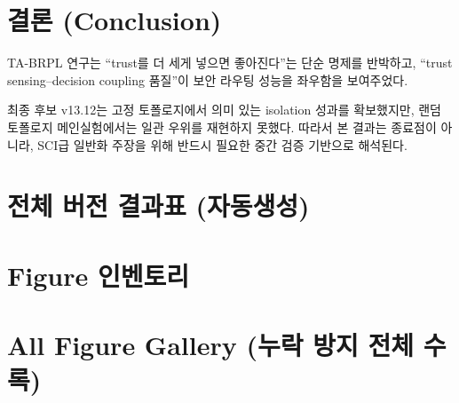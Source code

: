 \documentclass[11pt,a4paper]{report}
\begin{document}
\chapter{결론 (Conclusion)}
TA-BRPL 연구는 ``trust를 더 세게 넣으면 좋아진다''는 단순 명제를 반박하고,
``trust sensing--decision coupling 품질''이 보안 라우팅 성능을 좌우함을 보여주었다.

최종 후보 v13.12는 고정 토폴로지에서 의미 있는 isolation 성과를 확보했지만,
랜덤 토폴로지 메인실험에서는 일관 우위를 재현하지 못했다.
따라서 본 결과는 종료점이 아니라, SCI급 일반화 주장을 위해 반드시 필요한 중간 검증 기반으로 해석된다.

\appendix

\chapter{전체 버전 결과표 (자동생성)}


\chapter{Figure 인벤토리}


\chapter{All Figure Gallery (누락 방지 전체 수록)}

\end{document}
